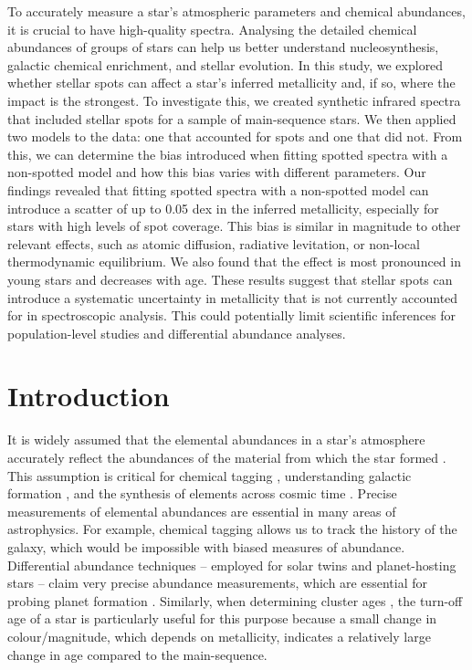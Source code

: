 To accurately measure a star's atmospheric parameters and chemical abundances, it is crucial to have high-quality spectra. Analysing the detailed chemical abundances of groups of stars can help us better understand nucleosynthesis, galactic chemical enrichment, and stellar evolution. In this study, we explored whether stellar spots can affect a star's inferred metallicity and, if so, where the impact is the strongest. To investigate this, we created synthetic infrared spectra that included stellar spots for a sample of main-sequence stars. We then applied two models to the data: one that accounted for spots and one that did not. From this, we can determine the bias introduced when fitting spotted spectra with a non-spotted model and how this bias varies with different parameters. Our findings revealed that fitting spotted spectra with a non-spotted model can introduce a scatter of up to 0.05 dex in the inferred metallicity, especially for stars with high levels of spot coverage. This bias is similar in magnitude to other relevant effects, such as atomic diffusion, radiative levitation, or non-local thermodynamic equilibrium. We also found that the effect is most pronounced in young stars and decreases with age. These results suggest that stellar spots can introduce a systematic uncertainty in metallicity that is not currently accounted for in spectroscopic analysis. This could potentially limit scientific inferences for population-level studies and differential abundance analyses.

\newpage

\section{Introduction}
\label{sec:intro}

It is widely assumed that the elemental abundances in a star's atmosphere accurately reflect the abundances of the material from which the star formed \citep{gibson_galactic_2003,pagel_nucleosynthesis_2009,salaris_chemical_2017}. This assumption is critical for chemical tagging \citep{anders_galactic_2016, randich_gaia-eso_2022}, understanding galactic formation \citep{gibson_galactic_2003}, and the synthesis of elements across cosmic time \citep{mcwilliam_origin_2004,johnson_origin_2020}. Precise 
measurements of elemental abundances are essential in many areas of astrophysics. For example, chemical tagging allows us to track the history of the galaxy, which would be impossible with biased measures of abundance. Differential abundance techniques \citep{reggiani_first_2016} -- employed for solar twins and planet-hosting stars -- claim very precise abundance measurements, which are essential for probing planet formation \citep{tayar_guide_2022}. Similarly, when determining cluster ages \citep{bensby_possible_2004, pont_isochrone_2004}, the turn-off age of a star is particularly useful for this purpose because a small change in colour/magnitude, which depends on metallicity, indicates a relatively large change in age compared to the main-sequence.

